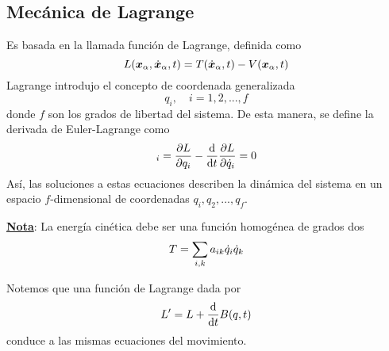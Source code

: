 \subsection{Mecánica de Lagrange}
Es basada en la llamada función de Lagrange, definida como
\begin{equation}
  L(\vb*{x}_\alpha ,\dot{\vb*{x}}_\alpha ,t)=T(\dot{\vb*{x}}_\alpha ,t)-V(\vb*{x}_\alpha ,t)
\end{equation}
Lagrange introdujo el concepto de coordenada generalizada
\begin{equation}
  q_i,\quad i=1,2,...,f
\end{equation}
donde $f$ son los grados de libertad del sistema. De esta manera, se define la derivada de Euler-Lagrange como
\begin{equation}
  [L]_i=\EL=0
\end{equation}
Así, las soluciones a estas ecuaciones describen la dinámica del sistema en un espacio $f$-dimensional de coordenadas $q_i,q_2,...,q_f$.

\underline{\textbf{Nota}}: La energía cinética debe ser una función homogénea de grados dos
\begin{equation}
  T=\sum_{i,k} a_{ik}\dot{q}_i\dot{q}_k
\end{equation}

Notemos que una función de Lagrange dada por
\begin{equation}
  L'=L+\dv{t}B(q,t)
\end{equation}
conduce a las mismas ecuaciones del movimiento.

